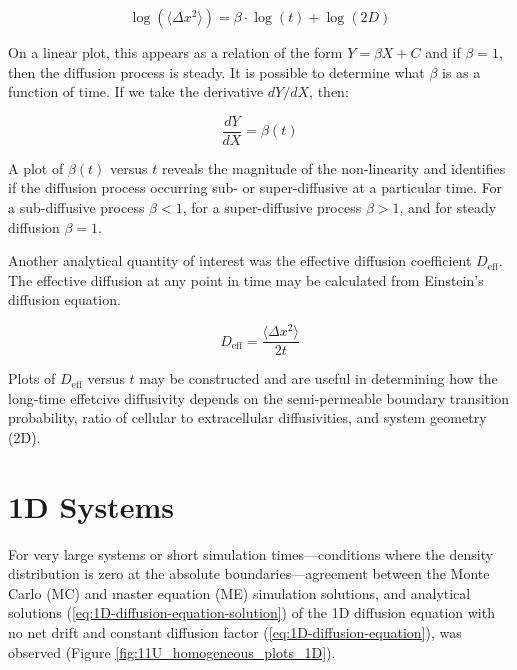 	\begin{equation}
		\log\left( \langle \Delta x^2 \rangle \right) = \beta \cdot \log(t) + \log(2D)
	\end{equation}	
	
	On a linear plot, this appears as a relation of the form $ Y = \beta X + C $ and if $ \beta = 1 $, then the diffusion process is steady. It is possible to determine what $ \beta $ is as a function of time. If we take the derivative $ dY/dX $, then:
	
	\begin{equation}
		\dfrac{dY}{dX} = \beta (t)
	\end{equation}
	
	A plot of $ \beta (t) $ versus $ t $ reveals the magnitude of the non-linearity and identifies if the diffusion process occurring sub- or super-diffusive at a particular time. For a sub-diffusive process $ \beta < 1 $, for a super-diffusive process $ \beta > 1 $, and for steady diffusion $ \beta = 1 $.
	
	Another analytical quantity of interest was the effective diffusion coefficient $ D_\textrm{eff} $. The effective diffusion at any point in time may be calculated from Einstein's diffusion equation.
	
	\begin{equation}
		D_\textrm{eff} = \dfrac{\langle \Delta x^2 \rangle}{2t}
	\end{equation}
	
	Plots of $ D_\textrm{eff} $ versus $ t $ may be constructed and are useful in determining how the long-time effetcive diffusivity depends on the semi-permeable boundary transition probability, ratio of cellular to extracellular diffusivities, and system geometry (2D).
	 
	
\section{1D Systems}
\label{sec:ra-1D}
	For very large systems or short simulation times---conditions where the density distribution is zero at the absolute boundaries---agreement between the Monte Carlo (MC) and master equation (ME) simulation solutions, and analytical solutions (\ref{eq:1D-diffusion-equation-solution}) of the 1D diffusion equation with no net drift and constant diffusion factor (\ref{eq:1D-diffusion-equation}), was observed (Figure \ref{fig:11U_homogeneous_plots_1D}). 

